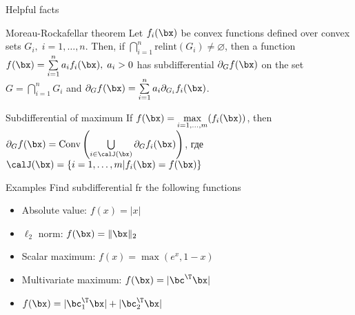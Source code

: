\documentclass[12pt]{beamer}
\begin{document}
\begin{frame}{Helpful facts}
\begin{block}{Moreau-Rockafellar theorem}
Let $f_i(\bx)$ be convex functions defined over convex sets $G_i, \; i = 1,\ldots,n$. 
Then, if $\bigcap\limits_{i=1}^n \text{relint} (G_i) \neq \varnothing$, then a function $f(\bx) = \sum\limits_{i=1}^n a_i f_i(\bx), \; a_i > 0$ has subdifferential $\partial_G f(\bx)$ on the set $G = \bigcap\limits_{i=1}^n G_i$ and $\partial_G f(\bx) = \sum\limits_{i=1}^n a_i \partial_{G_i} f_i(\bx)$. 
\end{block}

\begin{block}{Subdifferential of maximum}
If $f(\bx) = \max\limits_{i=1,\ldots,m}(f_i(\bx))$, then 
\pause
$\partial_G f(\bx) = \text{Conv} \left(\bigcup\limits_{i \in \calJ(\bx)} \partial_G f_i(\bx)\right)$, где $\calJ(\bx) = \{ i = 1,\ldots, m | f_i(\bx) = f(\bx) \}$
\end{block}
\end{frame}

\begin{frame}{Examples}
Find subdifferential fr the following functions
\begin{itemize}
\item Absolute value: $f(x) = |x|$
\item $\ell_2$ norm: $f(\bx) = \| \bx \|_2$
\item Scalar maximum: $f(x) = \max(e^x, 1 - x)$
\item Multivariate maximum: $f(\bx) = |\bc^{\T}\bx|$
\item $f(\bx) = |\bc^{\T}_1\bx| + |\bc^{\T}_2\bx|$
\end{itemize}
\end{frame}
\end{document}
